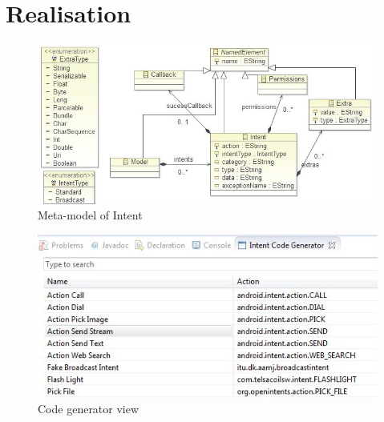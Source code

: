 \section{Realisation}

\begin{figure}[h!]
  \centering
    \includegraphics[width=\textwidth]{metamodel}
  \caption{Meta-model of Intent}
\end{figure}

\begin{figure}[h!]
  \centering
    \includegraphics[width=\textwidth]{codegenerator}
  \caption{Code generator view}
\end{figure}